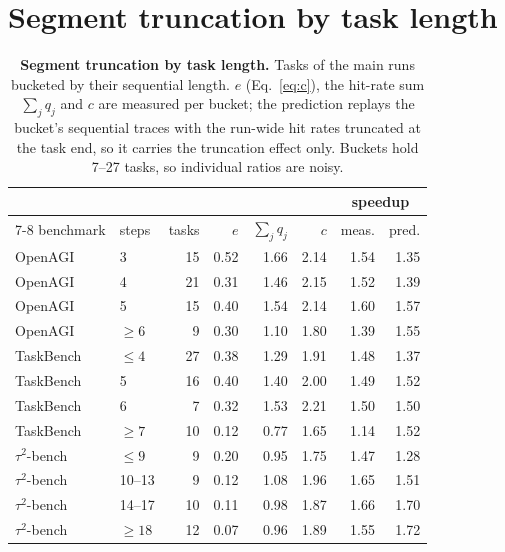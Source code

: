 \section{Segment truncation by task length}
\label{app:length}
\begin{table}[h]
\centering
\caption{\textbf{Segment truncation by task length.} Tasks of the main runs bucketed by their sequential
length. $e$ (Eq.~\ref{eq:c}), the hit-rate sum $\sum_j q_j$ and $c$ are measured per bucket; the
prediction replays the bucket's sequential traces with the run-wide hit rates truncated at the task end,
so it carries the truncation effect only. Buckets hold 7--27 tasks, so individual ratios are noisy.}
\label{tab:length}
\small
\begin{tabular}{llrrrrrr}
\toprule
 & & & & & & \multicolumn{2}{c}{speedup} \\
\cmidrule(lr){7-8}
benchmark & steps & tasks & $e$ & $\sum_j q_j$ & $c$ & meas. & pred. \\
\midrule
OpenAGI   & 3        & 15 & 0.52 & 1.66 & 2.14 & 1.54\xx{} & 1.35\xx{} \\
OpenAGI   & 4        & 21 & 0.31 & 1.46 & 2.15 & 1.52\xx{} & 1.39\xx{} \\
OpenAGI   & 5        & 15 & 0.40 & 1.54 & 2.14 & 1.60\xx{} & 1.57\xx{} \\
OpenAGI   & $\ge 6$  &  9 & 0.30 & 1.10 & 1.80 & 1.39\xx{} & 1.55\xx{} \\
\midrule
TaskBench & $\le 4$  & 27 & 0.38 & 1.29 & 1.91 & 1.48\xx{} & 1.37\xx{} \\
TaskBench & 5        & 16 & 0.40 & 1.40 & 2.00 & 1.49\xx{} & 1.52\xx{} \\
TaskBench & 6        &  7 & 0.32 & 1.53 & 2.21 & 1.50\xx{} & 1.50\xx{} \\
TaskBench & $\ge 7$  & 10 & 0.12 & 0.77 & 1.65 & 1.14\xx{} & 1.52\xx{} \\
\midrule
$\tau^2$-bench   & $\le 9$  &  9 & 0.20 & 0.95 & 1.75 & 1.47\xx{} & 1.28\xx{} \\
$\tau^2$-bench   & 10--13   &  9 & 0.12 & 1.08 & 1.96 & 1.65\xx{} & 1.51\xx{} \\
$\tau^2$-bench   & 14--17   & 10 & 0.11 & 0.98 & 1.87 & 1.66\xx{} & 1.70\xx{} \\
$\tau^2$-bench   & $\ge 18$ & 12 & 0.07 & 0.96 & 1.89 & 1.55\xx{} & 1.72\xx{} \\
\bottomrule
\end{tabular}
\end{table}

